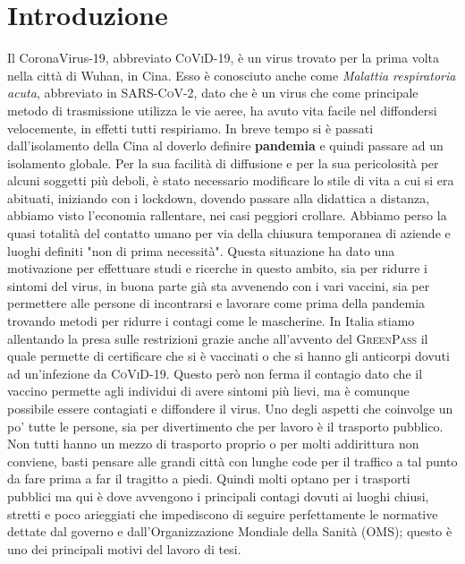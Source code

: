 \documentclass[12pt, openany]{book}
\begin{document}
	
	
	\tableofcontents
	\chapter*{Introduzione}	
		Il CoronaVirus-19, abbreviato \textsc{CoViD-19}, è un virus trovato per la prima volta nella città di Wuhan, in Cina. Esso è conosciuto anche come \emph{Malattia respiratoria acuta}, abbreviato in \textsc{SARS-CoV-2}, dato che è un virus che come principale metodo di trasmissione utilizza le vie aeree, ha avuto vita facile nel diffondersi velocemente, in effetti tutti respiriamo. In breve tempo si è passati dall'isolamento della Cina al doverlo definire \textbf{pandemia} e quindi passare ad un isolamento globale.
		Per la sua facilità di diffusione e per la sua pericolosità per alcuni soggetti più deboli, è stato necessario modificare lo stile di vita a cui si era abituati, iniziando con i lockdown, dovendo passare alla didattica a distanza, abbiamo visto l'economia rallentare, nei casi peggiori crollare. Abbiamo perso la quasi totalità del contatto umano per via  della chiusura temporanea di aziende e luoghi definiti "non di prima necessità".
		Questa situazione ha dato una motivazione per effettuare studi e ricerche in questo ambito, sia per ridurre i sintomi del virus, in buona parte già sta avvenendo con i vari vaccini, sia per permettere alle persone di incontrarsi e lavorare come prima della pandemia trovando metodi per ridurre i contagi come le mascherine. In Italia stiamo allentando la presa sulle restrizioni grazie anche all'avvento del \textsc{GreenPass} il quale permette di certificare che si è vaccinati o che si hanno gli anticorpi dovuti ad un'infezione da \textsc{CoViD-19}. Questo però non ferma il contagio dato che il vaccino permette agli individui di avere sintomi più lievi, ma è comunque possibile essere contagiati e diffondere il virus. 
		Uno degli aspetti che coinvolge un po' tutte le persone, sia per divertimento che per lavoro è il trasporto pubblico. Non tutti hanno un mezzo di trasporto proprio o per molti addirittura non conviene, basti pensare alle grandi città con lunghe code per il traffico a tal punto da fare prima a far il tragitto a piedi. Quindi molti optano per i trasporti pubblici ma qui è dove avvengono i principali contagi dovuti ai luoghi chiusi, stretti e poco arieggiati che impediscono di seguire perfettamente le normative dettate dal governo e dall'Organizzazione Mondiale della Sanità (OMS); questo è uno dei principali motivi del lavoro di tesi.\\
\end{document}
